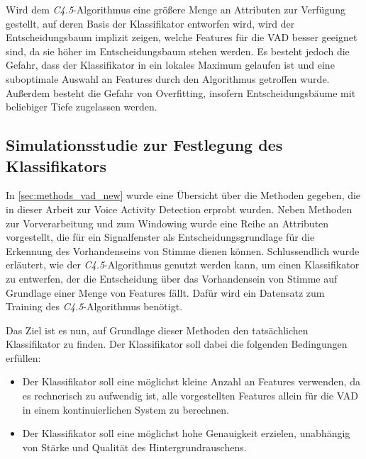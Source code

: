 Wird dem \emph{C4.5}-Algorithmus eine größere Menge an Attributen zur Verfügung gestellt, auf deren Basis der Klassifikator entworfen wird, wird der Entscheidungsbaum implizit zeigen, welche Features für die VAD besser geeignet sind, da sie höher im Entscheidungsbaum stehen werden. Es besteht jedoch die Gefahr, dass der Klassifikator in ein lokales Maximum gelaufen ist und eine suboptimale Auswahl an Features durch den Algorithmus getroffen wurde. Außerdem besteht die Gefahr von Overfitting, insofern Entscheidungsbäume mit beliebiger Tiefe zugelassen werden.

\subsection{Simulationsstudie zur Festlegung des Klassifikators}
\label{sec:vad_study}

In \autoref{sec:methods_vad_new} wurde eine Übersicht über die Methoden gegeben, die in dieser Arbeit zur Voice Activity Detection erprobt wurden. Neben Methoden zur Vorverarbeitung und zum Windowing wurde eine Reihe an Attributen vorgestellt, die für ein Signalfenster als Entscheidungsgrundlage für die Erkennung des Vorhandenseins von Stimme dienen können. Schlussendlich wurde erläutert, wie der \emph{C4.5}-Algorithmus genutzt werden kann, um einen Klassifikator zu entwerfen, der die Entscheidung über das Vorhandensein von Stimme auf Grundlage einer Menge von Features fällt. Dafür wird ein Datensatz zum Training des \emph{C4.5}-Algorithmus benötigt.

Das Ziel ist es nun, auf Grundlage dieser Methoden den tatsächlichen Klassifikator zu finden. Der Klassifikator soll dabei die folgenden Bedingungen erfüllen:

\begin{itemize}
\item Der Klassifikator soll eine möglichst kleine Anzahl an Features verwenden, da es rechnerisch zu aufwendig ist, alle vorgestellten Features allein für die VAD in einem kontinuierlichen System zu berechnen.
\item Der Klassifikator soll eine möglichst hohe Genauigkeit erzielen, unabhängig von Stärke und Qualität des Hintergrundrauschens.
\end{itemize}


